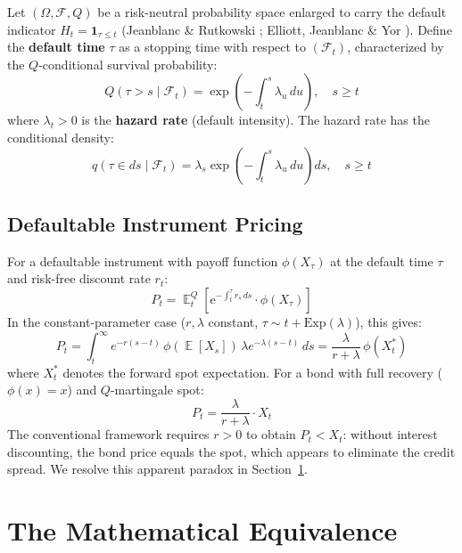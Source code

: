 \documentclass[10pt,twocolumn]{article}
\theoremstyle{plain}
\theoremstyle{definition}
\DeclareMathOperator{\E}{\mathbb{E}}
\newcommand{\F}{\mathcal{F}}
\begin{document}
Let $(\Omega, \F, Q)$ be a risk-neutral probability space enlarged
to carry the default indicator $H_t = \mathbf{1}_{\tau \leq t}$
(Jeanblanc \& Rutkowski \cite{JeanblanRutkowski2000};
Elliott, Jeanblanc \& Yor \cite{ElliottJeanblanc2000}). Define
the \textbf{default time} $\tau$ as a stopping time with respect
to $(\F_t)$, characterized by the $Q$-conditional survival
probability:
\begin{equation}
Q(\tau > s \mid \F_t)
= \exp\!\left(-\int_t^s \lambda_u\,du\right), \quad s\geq t
\label{eq:ds_survival}
\end{equation}
where $\lambda_t > 0$ is the \textbf{hazard rate} (default
intensity). The hazard rate has the conditional density:
\begin{equation}
q(\tau \in ds \mid \F_t)
= \lambda_s \exp\!\left(-\int_t^s \lambda_u\,du\right)ds,
\quad s\geq t
\label{eq:ds_density}
\end{equation}

\subsection{Defaultable Instrument Pricing}

For a defaultable instrument with payoff function $\phi(X_\tau)$
at the default time $\tau$ and risk-free discount rate $r_t$:
\begin{equation}
P_t = \E^Q_t\!\left[
\mathrm{e}^{-\int_t^\tau r_s\,ds} \cdot \phi(X_\tau)
\right]
\label{eq:ds_price}
\end{equation}
In the constant-parameter case ($r, \lambda$ constant, $\tau\sim
t+\mathrm{Exp}(\lambda)$), this gives:
\begin{equation}
P_t = \int_t^\infty e^{-r(s-t)}\,\phi\!\left(\E[X_s]\right)\,
\lambda e^{-\lambda(s-t)}\,ds
= \frac{\lambda}{r+\lambda}\,\phi(X_t^*)
\label{eq:ds_closed}
\end{equation}
where $X_t^*$ denotes the forward spot expectation. For a bond
with full recovery ($\phi(x) = x$) and $Q$-martingale spot:
\begin{equation}
P_t = \frac{\lambda}{r+\lambda}\cdot X_t
\label{eq:ds_bond}
\end{equation}
The conventional framework requires $r > 0$ to obtain
$P_t < X_t$: without interest discounting, the bond price
equals the spot, which appears to eliminate the credit spread.
We resolve this apparent paradox in Section~\ref{sec:equiv}.

\section{The Mathematical Equivalence}
\label{sec:equiv}
\end{document}
